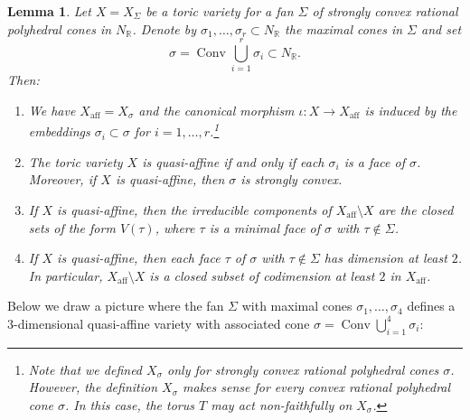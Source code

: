 \documentclass[11pt]{article}
\numberwithin{equation}{section}
\theoremstyle{plain}
\newtheorem{lemma}[theorem]{Lemma}
\theoremstyle{definition}
\DeclareMathOperator{\aff}{aff}
\DeclareMathOperator{\Conv}{Conv}
\newcommand{\RR}{\mathbb{R}}
\begin{document}
\begin{lemma}
\label{lem.toric_qusi-affine}
Let $X = X_{\Sigma}$ be a toric variety for a fan $\Sigma$ of strongly convex rational
polyhedral cones in $N_{\RR}$. Denote by $\sigma_1, \ldots, \sigma_r \subset N_{\RR}$
the maximal cones in $\Sigma$ and set
\[
\sigma = \Conv \bigcup_{i=1}^r \sigma_i \subset N_{\RR}.
\]
Then:
\begin{enumerate}
\item \label{lem.toric_qusi-affine1} We have $X_{\aff} = X_\sigma$
and the canonical morphism $\iota \colon X \to X_{\aff}$
is induced by the embeddings $\sigma_i \subset \sigma$ for $i=1, \ldots, r$.\footnote{Note that we defined $X_{\sigma}$ only for strongly convex rational polyhedral
cones $\sigma$. However, the definition $X_{\sigma}$ makes sense for every convex rational polyhedral
cone $\sigma$. In this case, the torus $T$ may act non-faithfully on $X_\sigma$.}
\item \label{lem.toric_qusi-affine2}
The toric variety $X$ is quasi-affine if and only if each $\sigma_i$ is a face of $\sigma$.
Moreover, if $X$ is quasi-affine, then $\sigma$ is strongly convex.
\item \label{lem.toric_qusi-affine3}
If $X$ is quasi-affine, then the irreducible components of $X_{\aff} \setminus X$ are the
closed sets of the form $V(\tau)$, where $\tau$ is a minimal face of $\sigma$ with $\tau \not\in \Sigma$.
\item \label{lem.toric_qusi-affine4}
If $X$ is quasi-affine, then each face $\tau$ of $\sigma$ with $\tau \not\in \Sigma$
has dimension at least $2$. In particular,
$X_{\aff} \setminus X$ is a closed subset of codimension at least $2$
in $X_{\aff}$.
\end{enumerate}
\end{lemma}

Below we draw a picture where the fan $\Sigma$ with maximal cones $\sigma_1, \ldots, \sigma_4$
defines a $3$-dimensional quasi-affine variety with associated cone
$\sigma = \Conv \bigcup_{i=1}^4 \sigma_i$:\vspace*{5pt}
\end{document}
